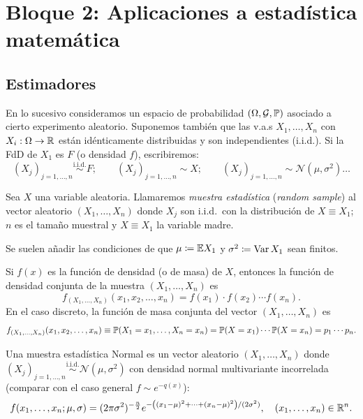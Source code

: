 

\part*{Bloque 2: Aplicaciones a estadística matemática}

\chapter{Estimadores}

En lo sucesivo consideramos un espacio de probabilidad $(\Omega, \mathcal{G}, \mathbb{P})$ asociado a cierto experimento aleatorio. Suponemos también que las v.a.s $X_1, \dots, X_n$ con $X_i : \Omega \to \mathbb{R}$ están idénticamente distribuidas y son independientes (i.i.d.). Si la FdD de $X_1$ es $F$ (o densidad $f$), escribiremos:
\[
  (X_j)_{j=1,\dots,n} \stackrel{\text{i.i.d.}}{\sim} F; \qquad (X_j)_{j=1,\dots,n} \sim X; \qquad (X_j)_{j=1,\dots,n} \sim \mathcal{N}(\mu, \sigma^2)\dots
\]

\begin{definicion}[1]
Sea $X$ una variable aleatoria. Llamaremos \emph{muestra estadística} (\emph{random sample}) al vector aleatorio $(X_1, \dots, X_n)$ donde $X_j$ son i.i.d.\ con la distribución de $X \equiv X_1$; $n$ es el tamaño muestral y $X \equiv X_1$ la variable madre.
\end{definicion}

Se suelen añadir las condiciones de que $\mu \coloneqq \mathbb{E} X_1$ y $\sigma^2 \coloneqq \operatorname{Var} X_1$ sean finitos.

Si $f(x)$ es la función de densidad (o de masa) de $X$, entonces la función de densidad conjunta de la muestra $(X_1, \dots, X_n)$ es
\[
  f_{(X_1, \dots, X_n)}(x_1, x_2, \dots, x_n) = f(x_1) \cdot f(x_2) \cdots f(x_n).
\]
En el caso discreto, la función de masa conjunta del vector $(X_1, \dots, X_n)$ es
\[
  f_{(X_1, \dots, X_n)}(x_1, x_2, \dots, x_n) \equiv \mathbb{P}(X_1 = x_1, \dots, X_n = x_n) = \mathbb{P}(X = x_1) \cdots \mathbb{P}(X = x_n) = p_1 \cdots p_n.
\]

\begin{observacion}[1]
Una muestra estadística Normal es un vector aleatorio $(X_1, \dots, X_n)$ donde $(X_j)_{j=1,\dots,n} \stackrel{\text{i.i.d.}}{\sim} \mathcal{N}(\mu, \sigma^2)$ con densidad normal multivariante incorrelada (comparar con el caso general $f \sim e^{-q(x)}$):
\[
  f(x_1, \dots, x_n; \mu, \sigma) = (2\pi\sigma^2)^{-\frac{n}{2}} e^{-\left((x_1-\mu)^2 + \dots + (x_n-\mu)^2\right)/(2\sigma^2)}, \quad (x_1, \dots, x_n) \in \mathbb{R}^n.
\]
\end{observacion}

